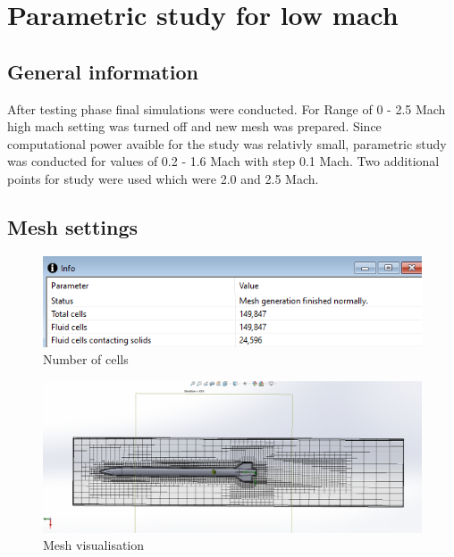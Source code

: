 \documentclass{article}
\begin{document}
\section{Parametric study for low mach}
\subsection{General information}
After testing phase final simulations were conducted. For Range of 0 - 2.5 Mach high mach setting was turned off and new mesh was prepared. Since computational power avaible for the study was relativly small, parametric study was conducted for values of 0.2 - 1.6 Mach with step 0.1 Mach. Two additional points for study were used which were 2.0 and 2.5 Mach.

\subsection{Mesh settings}

\begin{figure}[H]
\centering
\includegraphics[width=\textwidth]{MESHCELLS}
\caption{Number of cells}
\label{fig:MESHCELLS}
\end{figure}

\begin{figure}[H]
\centering
\includegraphics[width=\textwidth]{FinalMESH}
\caption{Mesh visualisation}
\label{fig:FinalMESH}
\end{figure}
\end{document}
